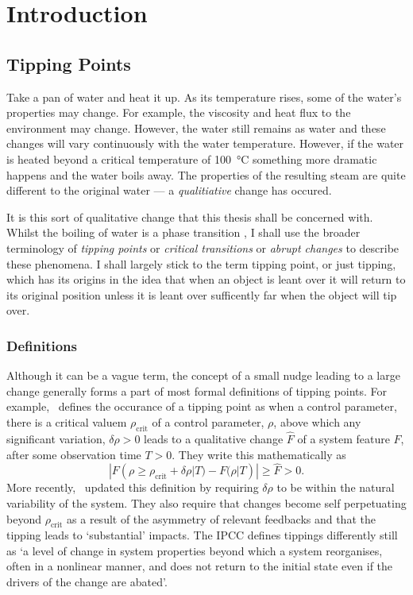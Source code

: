 \chapter{Introduction}
\graphicspath{{introduction/figs}}

\section{Tipping Points}
Take a pan of water and heat it up. As its temperature rises, some of the water's properties may change. For example, the viscosity and heat flux to the
environment may change. However, the water still remains as water and these changes will vary continuously with the water temperature. However, if the water is heated beyond
a critical temperature of \SI{100}{\degreeCelsius} something more dramatic happens and the water boils away. The properties of the resulting steam are quite different
to the original water --- a \emph{qualitiative} change has occured.

It is this sort of qualitative change that this thesis shall be concerned with. Whilst the boiling of water is a phase transition \parencite{Goldenfeld1992}, I shall use the broader terminology
of \emph{tipping points} \parencite{Lenton2008} or \emph{critical transitions} \parencite{Rahmstorf1995} or \emph{abrupt changes} \parencite{Alley2003} to describe these phenomena. I shall largely stick
to the term tipping point, or just tipping, which has its origins in the idea that when an object is leant over it will return to its original position unless it is leant over sufficently far when the object
will tip over.

\subsection{Definitions}

Although it can be a vague term, the concept of a small nudge leading to a large change generally forms a part of most formal definitions of tipping points.
For example,~\cite{Lenton2008} defines the occurance of a tipping
point as when a control parameter, there is a critical valuem $\rho_{\mathrm{crit}}$ of a control parameter, $\rho$, above which any significant variation, $\delta \rho > 0$ leads to a qualitative change
$\hat{F}$ of a system feature $F$, after some observation time $T > 0$. They write this mathematically as
\begin{equation}
  \label{eq:lenton_tipping_definition}
  |F(\rho \geq \rho_{\mathrm{crit}} + \delta \rho | T) - F(\rho|T)| \geq \hat{F} > 0.
\end{equation}
More recently,~\cite{ArmstrongMcKay2022} updated this definition by requiring $\delta \rho$ to be within the natural variability of the system. They also require that changes become self perpetuating
beyond $\rho_{\mathrm{crit}}$ as a result of the asymmetry of relevant feedbacks and that the tipping leads to `substantial' impacts. The IPCC \parencite{AR6} defines tippings differently still
as `a level of change in system properties beyond which a system reorganises, often in a nonlinear manner, and does not return to the initial state even if the drivers of the change are abated'.

